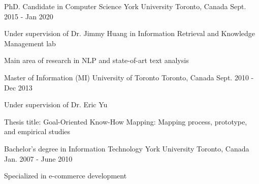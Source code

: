 \vspace{-0.5em}
\begin{cventries}
  \cventry
    {PhD. Candidate in Computer Science}
    {York University}
    {Toronto, Canada}
    {Sept. 2015 - Jan 2020}
    {
      \begin{cvitems}
        \item {Under supervision of Dr. Jimmy Huang in Information Retrieval and Knowledge Management lab}
        \item{Main area of research in NLP and state-of-art text analysis}
      \end{cvitems}
    }
  \cventry
    {Master of Information (MI)}
    {University of Toronto}
    {Toronto, Canada}
    {Sept. 2010 - Dec 2013}
    {
      \begin{cvitems}
      	\item{Under supervision of Dr. Eric Yu}
        \item{Thesis title: Goal-Oriented Know-How Mapping: Mapping process, prototype, and empirical studies}
      \end{cvitems}
    }
  \cventry
    {Bachelor's degree in Information Technology}
    {York University}
    {Toronto, Canada}
    {Jan. 2007 - June 2010}
    {
      \begin{cvitems}
        \item {Specialized in e-commerce development}
      \end{cvitems}
    }
    \vspace{-1em}
\end{cventries}
